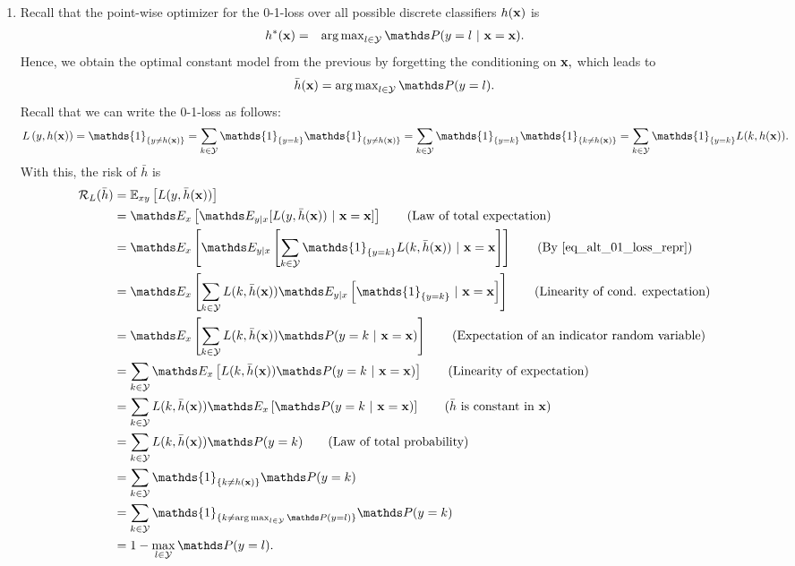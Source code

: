 \documentclass[a4paper]{article}
\begin{document}
{\begin{enumerate}
\item Recall that the point-wise optimizer for the 0-1-loss over all possible discrete classifiers $h(\mathbf{x})$  is
%
\begin{eqnarray*}  
	\hxbayes &=& \argmax_{l \in \Yspace} \P(y = l~|~ \xv = \xv).
\end{eqnarray*}
%
Hence, we obtain the optimal constant model from the previous by forgetting the conditioning on $\mathbf{x},$ which leads to 
%
$$
\bar{h}(\xv) =   \argmax_{l \in \Yspace} \P(y = l ).
$$
%
Recall that we can write the 0-1-loss as follows:
%
\begin{align} \label{eq_alt_01_loss_repr}
%	
	\Lhxy 
%	
	= \mathds{1}_{\{y \ne \hx\}} 
%	
	= \sum_{k\in \Yspace} \mathds{1}_{\{y = k\}} \mathds{1}_{\{y \ne \hx\}}
%	
	= \sum_{k\in \Yspace} \mathds{1}_{\{y = k\}} \mathds{1}_{\{k \ne \hx\}}
%	
	= \sum_{k\in \Yspace} \mathds{1}_{\{y = k\}} L(k, h(\xv) ).
%	
\end{align}
%
With this, the risk of $\bar{h}$ is
%
\begin{align*}
%	
	\risk_L(\bar{h})  
%	
	&=  \Exy\left[  L(y,\bar{h}(\xv)) \right] \\
%	
	&=  \E_x \left[ \E_{y|x} [ L(y, \bar{h}(\xv)) ~|~ \xv = \xv ] \right] \tag{Law of total expectation} \\
%	
	&=  \E_x \left[ \E_{y|x} \left[ \sum_{k \in \Yspace} \mathds{1}_{\{y  = k \}} L(k, \bar{h}(\xv)) ~|~ \xv = \xv \right] \right] \tag{By \eqref{eq_alt_01_loss_repr}} \\
%	
	&=  \E_x \left[ \sum_{k \in \Yspace} L(k, \bar{h}(\xv)) \E_{y|x}  \left[  \mathds{1}_{\{y  = k \}} ~|~ \xv = \xv  \right] \right] \tag{Linearity of cond. expectation} \\
%	
	&= \E_x \left[\sum_{k \in \Yspace} L(k, \bar{h}(\xv)) \P(y = k~|~ \xv = \xv)\right] \tag{Expectation of an indicator random variable} \\ 
%	
	&= \sum_{k \in \Yspace} \E_x \left[ L(k, \bar{h}(\xv)) \P(y = k~|~ \xv = \xv)\right] \tag{Linearity of  expectation} \\
	&= \sum_{k \in \Yspace} L(k, \bar{h}(\xv))  \E_x \left[ \P(y = k~|~ \xv = \xv)\right] \tag{$\bar{h}$ is constant in $\xv$} \\
	&= \sum_{k \in \Yspace} L(k, \bar{h}(\xv))  \P(y = k) \tag{Law of total probability} \\
%	
	&= \sum_{k \in \Yspace} \mathds{1}_{\{k \ne \hx \}}  \P(y = k)   \\
%	
	&= \sum_{k \in \Yspace} \mathds{1}_{\{k \ne   \argmax_{l \in \Yspace} \P(y = l ) \}}  \P(y = k)   \\
%	
	&= 1 - \max_{l \in \Yspace} \P(y = l).
%	
\end{align*}


\end{enumerate}}
\end{document}
